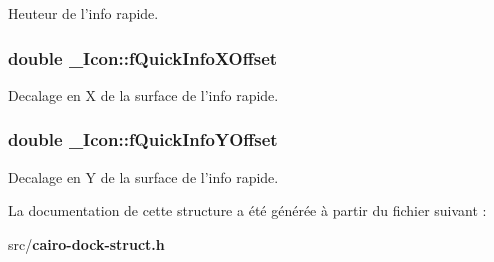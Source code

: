 Heuteur de l'info rapide. 

\subsubsection{\setlength{\rightskip}{0pt plus 5cm}double {\bf \_\-Icon::fQuickInfoXOffset}}\label{struct__Icon_aa5953181fa5eb4dc927396b1d3436cf}


Decalage en X de la surface de l'info rapide. 

\subsubsection{\setlength{\rightskip}{0pt plus 5cm}double {\bf \_\-Icon::fQuickInfoYOffset}}\label{struct__Icon_301e7fc7080150fcabbb0931319a9d0a}


Decalage en Y de la surface de l'info rapide. 



La documentation de cette structure a été générée à partir du fichier suivant :\begin{CompactItemize}
\item 
src/{\bf cairo-dock-struct.h}\end{CompactItemize}

